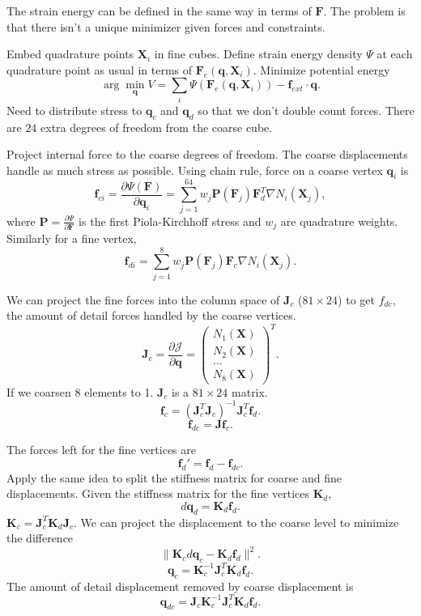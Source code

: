 \documentclass{article}
\newcommand{\mcJ}{\mathcal{J}}
\newcommand{\mbF}{\mathbf{F}}
\newcommand{\mbJ}{\mathbf{J}}
\newcommand{\mbK}{\mathbf{K}}
\newcommand{\mbP}{\mathbf{P}}
\newcommand{\mbX}{\mathbf{X}}
\newcommand{\mbf}{\mathbf{f}}
\newcommand{\mbq}{\mathbf{q}}
\begin{document}
The strain energy can be defined in the same way in terms of $\mbF$.
The problem is that there isn't a unique minimizer given forces and constraints.

Embed quadrature points $\mbX_i$ in fine cubes.
Define strain energy density $\Psi$ at each quadrature point as usual in terms of $\mbF_e(\mbq, \mbX_i)$.
Minimize potential energy
\[
\arg\min_{\mbq} V = \sum_i \Psi( \mbF_e(\mbq, \mbX_i) )
- \mbf_{ext} \cdot \mbq.
\]
Need to distribute stress to $\mbq_c$ and $\mbq_d$ so that we don't double count forces. There are $24$ extra degrees
of freedom from the coarse cube.

Project internal force to the coarse degrees of freedom. The coarse
displacements handle as much stress as possible.
Using chain rule, force on
a coarse vertex $\mbq_i$ is
\[
\mbf_{ci} = \frac{\partial\Psi(\mbF)}{\partial \mbq_i} = 
\sum_{j=1}^{64}w_j\mbP(\mbF_j)\mbF_d^T\nabla N_i(\mbX_j),
\]
where $\mbP=\frac{\partial\Psi}{\partial \mbF}$ is the first Piola-Kirchhoff stress and $w_j$ are quadrature weights.
Similarly for a fine vertex,
\[
\mbf_{di} = 
\sum_{j=1}^{8}w_j\mbP(\mbF_j)\mbF_c\nabla N_i(\mbX_j).
\]

We can project the fine forces into the column space of 
$\mbJ_c$ ($81\times 24$)
to get $f_{dc}$,
the amount of detail forces handled by the coarse vertices.
\[
\mbJ_c=\frac{\partial\mcJ}{\partial\mbq}=\begin{pmatrix}
N_1(\mbX)\\
N_2(\mbX)\\
...\\
N_8(\mbX)
\end{pmatrix}^T.
\]
If we coarsen 8 elements to 1. $\mbJ_c$ is a $81\times 24$ matrix.
\[
\mbf_{c} = (\mbJ_c^T\mbJ_c)^{-1}\mbJ_c^T\mbf_d.
\]
\[
\mbf_{dc} = \mbJ\mbf_c.
\]

The forces left for the fine vertices are 
\[
\mbf_d' = \mbf_d - \mbf_{dc}.
\]
Apply the same idea to split the stiffness
matrix for coarse and fine displacements.
Given the stiffness matrix for the fine vertices $\mbK_d$,
\[
d\mbq_d = \mbK_d\mbf_d.
\]
$\mbK_c=\mbJ_c^T\mbK_d\mbJ_c$.
We can project the displacement to the coarse level to minimize the difference
\[
\|\mbK_c d\mbq_c - \mbK_d\mbf_d\|^2.
\]
\[
\mbq_c = \mbK_c^{-1}\mbJ_c^T\mbK_d\mbf_d.
\]
The amount of detail displacement removed by coarse displacement
is
\[
\mbq_{dc} = \mbJ_c\mbK_c^{-1}\mbJ_c^T\mbK_d\mbf_d.
\]
\end{document}
